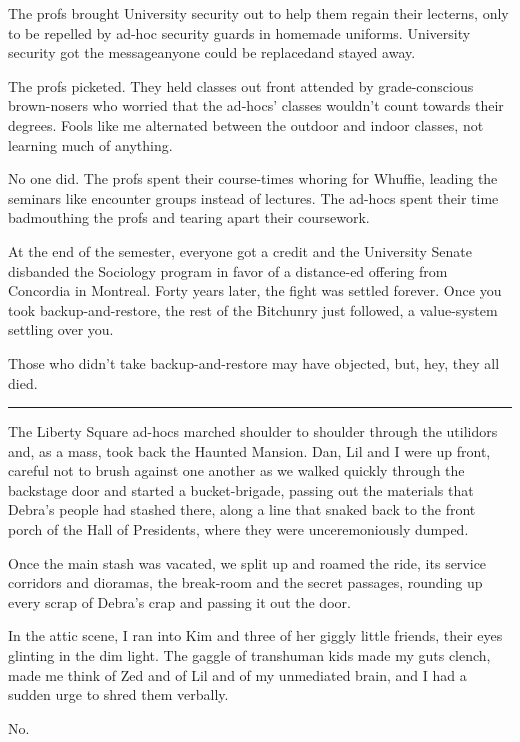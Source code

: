 The profs brought University security out to help them regain their
lecterns, only to be repelled by ad-hoc security guards in homemade
uniforms. University security got the message{\dash}anyone could be
replaced{\dash}and stayed away.

The profs picketed. They held classes out front attended by
grade-conscious brown-nosers who worried that the ad-hocs' classes
wouldn't count towards their degrees. Fools like me alternated
between the outdoor and indoor classes, not learning much of
anything.

No one did. The profs spent their course-times whoring for Whuffie,
leading the seminars like encounter groups instead of lectures. The
ad-hocs spent their time badmouthing the profs and tearing apart
their coursework.

At the end of the semester, everyone got a credit and the
University Senate disbanded the Sociology program in favor of a
distance-ed offering from Concordia in Montreal. Forty years later,
the fight was settled forever. Once you took backup-and-restore,
the rest of the Bitchunry just followed, a value-system settling
over you.

Those who didn't take backup-and-restore may have objected, but,
hey, they all died.

\begin{center}\rule{3in}{0.4pt}\end{center}

The Liberty Square ad-hocs marched shoulder to shoulder through the
utilidors and, as a mass, took back the Haunted Mansion. Dan, Lil
and I were up front, careful not to brush against one another as we
walked quickly through the backstage door and started a
bucket-brigade, passing out the materials that Debra's people had
stashed there, along a line that snaked back to the front porch of
the Hall of Presidents, where they were unceremoniously dumped.

Once the main stash was vacated, we split up and roamed the ride,
its service corridors and dioramas, the break-room and the secret
passages, rounding up every scrap of Debra's crap and passing it
out the door.

In the attic scene, I ran into Kim and three of her giggly little
friends, their eyes glinting in the dim light. The gaggle of
transhuman kids made my guts clench, made me think of Zed and of
Lil and of my unmediated brain, and I had a sudden urge to shred
them verbally.

No.

